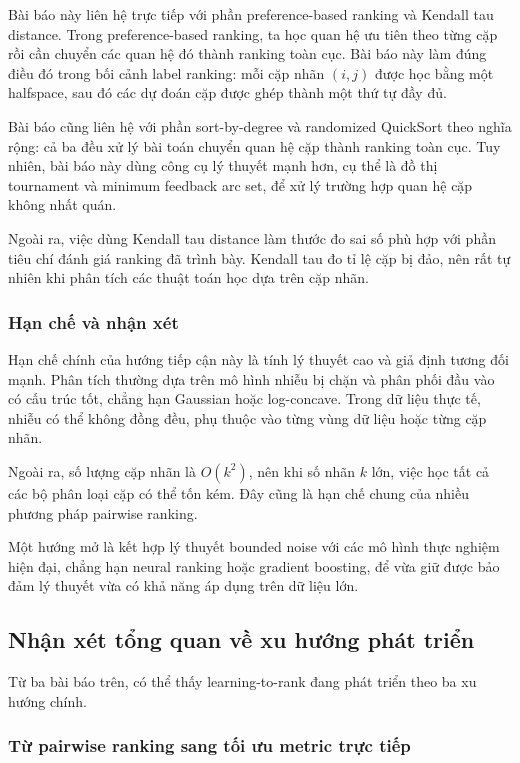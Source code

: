 Bài báo này liên hệ trực tiếp với phần preference-based ranking và Kendall tau distance. Trong preference-based ranking, ta học quan hệ ưu tiên theo từng cặp rồi cần chuyển các quan hệ đó thành ranking toàn cục. Bài báo này làm đúng điều đó trong bối cảnh label ranking: mỗi cặp nhãn \((i,j)\) được học bằng một halfspace, sau đó các dự đoán cặp được ghép thành một thứ tự đầy đủ.

Bài báo cũng liên hệ với phần sort-by-degree và randomized QuickSort theo nghĩa rộng: cả ba đều xử lý bài toán chuyển quan hệ cặp thành ranking toàn cục. Tuy nhiên, bài báo này dùng công cụ lý thuyết mạnh hơn, cụ thể là đồ thị tournament và minimum feedback arc set, để xử lý trường hợp quan hệ cặp không nhất quán.

Ngoài ra, việc dùng Kendall tau distance làm thước đo sai số phù hợp với phần tiêu chí đánh giá ranking đã trình bày. Kendall tau đo tỉ lệ cặp bị đảo, nên rất tự nhiên khi phân tích các thuật toán học dựa trên cặp nhãn.

\subsubsection{Hạn chế và nhận xét}

Hạn chế chính của hướng tiếp cận này là tính lý thuyết cao và giả định tương đối mạnh. Phân tích thường dựa trên mô hình nhiễu bị chặn và phân phối đầu vào có cấu trúc tốt, chẳng hạn Gaussian hoặc log-concave. Trong dữ liệu thực tế, nhiễu có thể không đồng đều, phụ thuộc vào từng vùng dữ liệu hoặc từng cặp nhãn.

Ngoài ra, số lượng cặp nhãn là \(O(k^2)\), nên khi số nhãn \(k\) lớn, việc học tất cả các bộ phân loại cặp có thể tốn kém. Đây cũng là hạn chế chung của nhiều phương pháp pairwise ranking.

Một hướng mở là kết hợp lý thuyết bounded noise với các mô hình thực nghiệm hiện đại, chẳng hạn neural ranking hoặc gradient boosting, để vừa giữ được bảo đảm lý thuyết vừa có khả năng áp dụng trên dữ liệu lớn.

\subsection{Nhận xét tổng quan về xu hướng phát triển}

Từ ba bài báo trên, có thể thấy learning-to-rank đang phát triển theo ba xu hướng chính.

\subsubsection{Từ pairwise ranking sang tối ưu metric trực tiếp}

